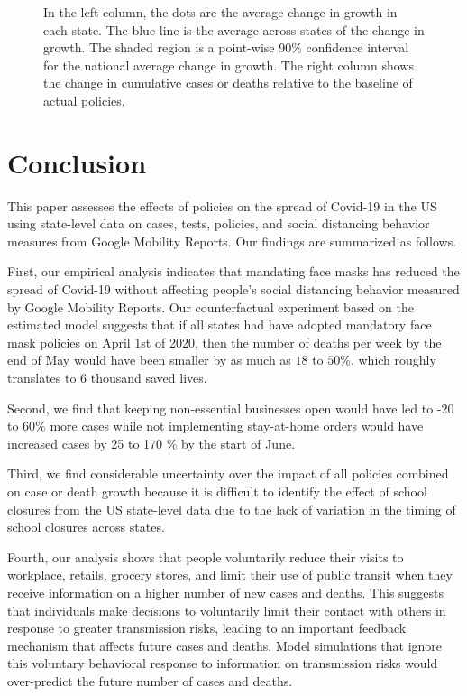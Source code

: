 \documentclass[11pt,reqno,letter]{amsart}
\theoremstyle{definition}
\begin{document}
\begin{figure}[ht]
\begin{minipage}{\linewidth}
    \begin{flushleft}
      \footnotesize In the left column, the dots are the average
      change in growth in each state. The blue line is the average
      across states of the change in growth. The shaded region is a
      point-wise 90\% confidence interval for the national average
      change in growth. The right column shows the change in
      cumulative cases or
      deaths relative to the baseline of actual policies.
    \end{flushleft}
  \end{minipage}
\end{figure}




\afterpage{\clearpage}

\section{Conclusion}


This paper assesses the effects of policies on the spread of Covid-19 in the US using state-level data on cases, tests, policies, and social distancing behavior measures from Google Mobility Reports. Our findings are summarized as follows.

First, our empirical analysis indicates that mandating face masks has
reduced the spread of Covid-19 without affecting people's social
distancing behavior measured by Google Mobility Reports. Our
counterfactual experiment based on the estimated model suggests that
if all states had have adopted mandatory face mask policies on April
1st of 2020, then the number of deaths per week
by the end of May would have been smaller by as much as  $18$ to $50$\%, which roughly translates to $6$ thousand saved lives.

Second, we find that keeping non-essential businesses open would have led to -20 to 60\% more cases  while not implementing stay-at-home orders would have increased cases by 25 to 170 \% by the start of June. %

Third, we find considerable uncertainty over  the impact of all policies combined on case or death growth because it is difficult to identify the effect of school closures from the US state-level data due to the lack of variation in the timing of school closures across states.

Fourth, our analysis shows that people voluntarily reduce their visits to workplace, retails, grocery stores, and limit their use of public transit when they receive  information on a higher number of new cases and deaths. This suggests that individuals make decisions to voluntarily limit their contact with others in response to greater transmission risks, leading to an important feedback mechanism that affects future cases and deaths. Model simulations that ignore this voluntary behavioral response to information on transmission risks would over-predict the future number of cases and deaths.
\end{document}

